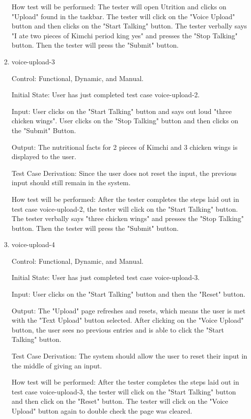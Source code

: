 \documentclass[12pt, titlepage]{article}
\begin{document}
\begin{enumerate}
	How test will be performed: The tester will open Utrition and clicks on "Upload" found in the taskbar. The tester will click on the "Voice Upload" button and then clicks on the "Start Talking" button. The tester verbally says "I ate two pieces of Kimchi period king yes" and presses the "Stop Talking" button. Then the tester will press the "Submit" button.
	
	\item{voice-upload-3\\}
	
	Control: Functional, Dynamic, and Manual.
	
	Initial State: User has just completed test case voice-upload-2.
	
	Input: User clicks on the "Start Talking" button and says out loud "three chicken wings". User clicks on the "Stop Talking" button and then clicks on the "Submit" Button.
	
	Output: The nutritional facts for 2 pieces of Kimchi and 3 chicken wings is displayed to the user.
	
	Test Case Derivation: Since the user does not reset the input, the previous input should still remain in the system.
	
	How test will be performed: After the tester completes the steps laid out in test case voice-upload-2, the tester will click on the "Start Talking" button. The tester verbally says "three chicken wings" and presses the "Stop Talking" button. Then the tester will press the "Submit" button.
	
	\item{voice-upload-4\\}
	
	Control: Functional, Dynamic, and Manual.
	
	Initial State: User has just completed test case voice-upload-3.
	
	Input: User clicks on the "Start Talking" button and then the "Reset" button.
	
	Output: The "Upload" page refreshes and resets, which means the user is met with the "Text Upload" button selected. After clicking on the "Voice Upload" button, the user sees no previous entries and is able to click the "Start Talking" button.
	
	Test Case Derivation: The system should allow the user to reset their input in the middle of giving an input.
	
	How test will be performed: After the tester completes the steps laid out in test case voice-upload-3, the tester will click on the "Start Talking" button and then click on the "Reset" button. The tester will click on the "Voice Upload" button again to double check the page was cleared.
	

\end{enumerate}
\end{document}

